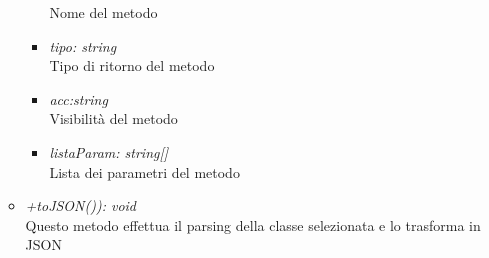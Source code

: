 \begin{itemize}
\begin{itemize}
\begin{itemize}
            					Nome del metodo
            					\item \emph{tipo: string}\\
            					Tipo di ritorno del metodo
            					\item \emph{acc:string}\\
            					Visibilità del metodo
            					\item \emph{listaParam: string[]}\\
            					Lista dei parametri del metodo
            				\end{itemize}
          				\item \emph{+toJSON()): void}\\
          				Questo metodo effettua il parsing della classe selezionata e lo trasforma in JSON
          			\end{itemize}
          		\end{itemize}
